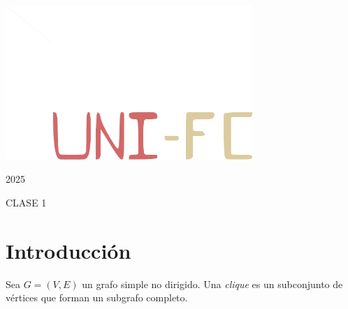 \documentclass[12pt]{article}
\renewcommand{\bfseries}{\color{rojoUNI}\fontseries{b}\selectfont} %
\begin{document}
\begin{titlepage}
    \centering
    
    
    \hspace{-2.5cm}\includegraphics[width=0.7\textwidth]{img/uni-fc2.pdf}\par\vspace{0.8cm}

    
    {\fontsize{72}{80}\selectfont\sffamily\bfseries\textcolor{rojoUNI}{2025}}\par\vspace{2cm}

    
    {\bfseries\Huge \textcolor{rojoUNI}{CLASE 1}}\par\vspace{0.5cm}
    
    
    \vfill
\end{titlepage}


\tableofcontents
\newpage

\section{Introducción}
\lipsum[1]

\begin{definicion}
Sea $G=(V,E)$ un grafo simple no dirigido. Una \textit{clique} es un subconjunto de vértices que forman un subgrafo completo.
\end{definicion}
\end{document}
